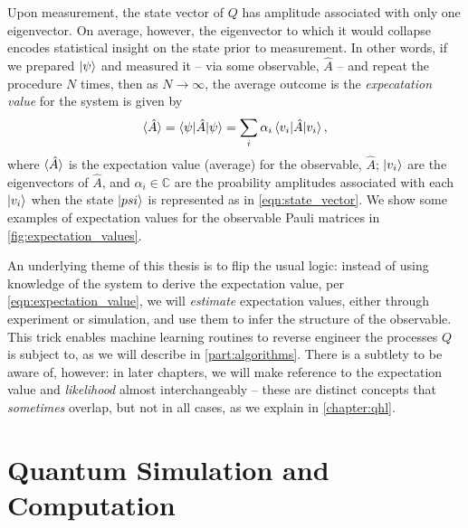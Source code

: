 {Upon measurement, the state vector of $Q$ has amplitude associated with only one eigenvector. 
On average, however, the eigenvector to which it would collapse encodes statistical insight on the 
    state prior to measurement. 
In other words, if we prepared $\ket{\psi}$ and measured it -- via some observable, $\hat{A}$ -- 
    and repeat the procedure $N$ times, 
    then as $N \rightarrow \infty$, the average outcome is the \emph{expecatation value}
    for the system is given by 
\begin{equation}
    \label{eqn:expectation_value}
    \braket{\hat{A}} = \braket{\psi | \hat{A} | \psi} = \sum\limits_{i} \alpha_i \braket{v_i | \hat{A} | v_i},  
\end{equation}
    where $\braket{\hat{A}}$ is the \gls{expectation value} (average) for the observable, $\hat{A}$; 
    $\ket{v_i}$ are the eigenvectors of $\hat{A}$, and $\alpha_i \in \mathbb{C}$ are the proability amplitudes
    associated with each $\ket{v_i}$ when the state $\ket{psi}$ is represented as in \cref{eqn:state_vector}.
We show some examples of \glspl{expectation value} for the observable Pauli matrices in \cref{fig:expectation_values}. 
\par 

An underlying theme of this thesis is to flip the usual logic: 
    instead of using knowledge of the system to derive the \gls{expectation value}, per \cref{eqn:expectation_value},
    we will \emph{estimate} \glspl{expectation value}, either through experiment or simulation, 
    and use them to infer the structure of the observable.
This trick enables machine learning routines to reverse engineer 
    the processes $Q$ is subject to, as we will describe in \cref{part:algorithms}. 
There is a subtlety to be aware of, however: 
    in later chapters, we will make reference to the \gls{expectation value} and \emph{\gls{likelihood}} 
    almost interchangeably -- these are distinct concepts that \emph{sometimes} overlap, but not in all cases,
    as we explain in \cref{chapter:qhl}. 



\section{Quantum Simulation and Computation}

}

